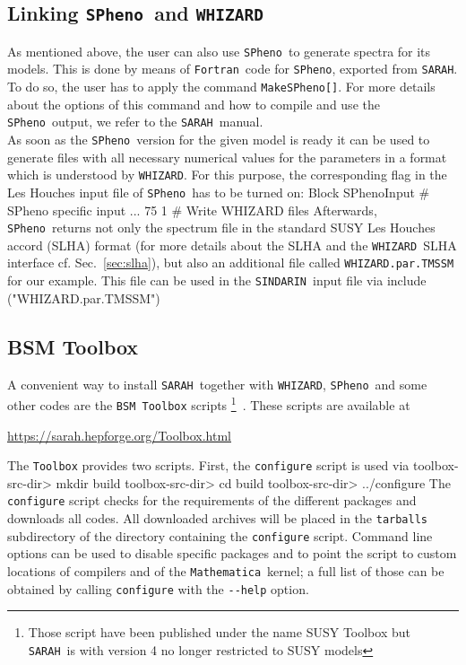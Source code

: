 \documentclass[12pt]{book}
\newenvironment{code}%
  {\begingroup\footnotesize
   \quote
   \Verbatim}%
  {\endVerbatim
   \endquote
   \endgroup\noindent}
\newcommand{\ttt}[1]{\texttt{#1}}
\newcommand{\whizard}{\ttt{WHIZARD}}
\newcommand{\sarah}{\ttt{SARAH}}
\newcommand{\spheno}{\ttt{SPheno}}
\newcommand{\Mathematica}{\ttt{Mathematica}}
\newcommand{\sindarin}{\ttt{SINDARIN}}
\newcommand{\fortran}{\ttt{Fortran}}
\begin{document}
\subsection{Linking \spheno\ and \whizard}
As mentioned above, the user can also use \spheno\ to generate spectra
for its models. This is done by means of \fortran\ code for \spheno,
exported from \sarah.  To do so, the user has to apply the command
\verb"MakeSPheno[]". For more details
about the options of this command and how to compile and use the \spheno\ output,
we refer to the \sarah\ manual. \\
As soon as the \spheno\ version for the given model is ready it can be used to
generate files with all necessary numerical values for the parameters in a format
which is understood by \whizard. For this purpose, the corresponding flag in the
Les Houches input file of \spheno\ has to be turned on:
\begin{code}
Block SPhenoInput   # SPheno specific input
...
75 1               # Write WHIZARD files
\end{code}
Afterwards, \spheno\ returns not only the spectrum file in the
standard SUSY Les Houches accord (SLHA) format (for more details about
the SLHA and the \whizard\ SLHA interface cf. Sec.~\ref{sec:slha}),
but also an additional file called \verb"WHIZARD.par.TMSSM" for our example.
This file can be used
in the \sindarin\ input file via
\begin{code}
include ("WHIZARD.par.TMSSM")
\end{code}


\subsection{BSM Toolbox}

A convenient way to install \sarah\ together with \whizard, \spheno\
and some  other codes are the \ttt{BSM Toolbox} scripts
\footnote{Those script have been published
under the name SUSY Toolbox but \sarah\ is with version 4 no longer
restricted to SUSY models}~\cite{Staub:2011dp}. These scripts are
available at
\begin{center}
 \url{https://sarah.hepforge.org/Toolbox.html}
\end{center}
The \ttt{Toolbox} provides two scripts. First, the \verb"configure" script is
used via
\begin{code}
toolbox-src-dir> mkdir build
toolbox-src-dir> cd build
toolbox-src-dir> ../configure
\end{code}
%
The  \verb"configure" script checks for the requirements of the
different packages and downloads all codes. All downloaded archives will
be placed in the \verb"tarballs" subdirectory of the directory containing the
\verb"configure" script.
Command line options can be used to disable specific packages and to point the
script to custom locations of compilers and of the \Mathematica\ kernel; a full
list of those can be obtained by calling \verb"configure" with the \verb"--help"
option.
\end{document}
